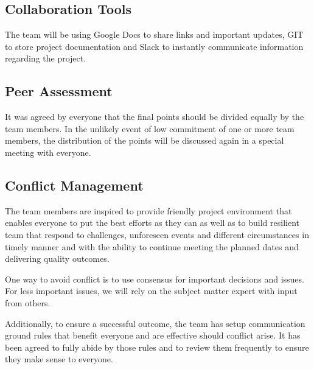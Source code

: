 \documentclass{article}
\begin{document}
\subsection{Collaboration Tools} The team will be using Google Docs to share links and important updates, GIT to store project documentation and Slack to instantly communicate information regarding the project.

\subsection{Peer Assessment} It was agreed by everyone that the final points should be divided equally by the team members. In the unlikely event of low commitment of one or more team members, the distribution of the points will be discussed again in a special meeting with everyone.

\subsection{Conflict Management}
The team members are inspired to provide friendly project environment that enables everyone to put the best efforts as they can as well as to build resilient team that respond to challenges, unforeseen events and different circumstances in timely manner and with the ability to continue meeting the planned dates and delivering quality outcomes.

One way to avoid conflict is to use consensus for important decisions and issues. For less important issues, we will rely on the subject matter expert with input from others.

Additionally, to ensure a successful outcome, the team has setup communication ground rules that benefit everyone and are effective should conflict arise. It has been agreed to fully abide by those rules and to review them frequently to ensure they make sense to everyone.
\end{document}
